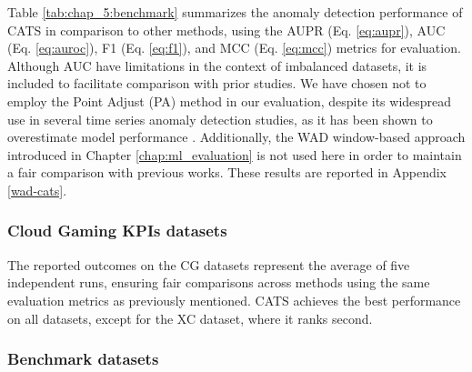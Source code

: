 Table \ref{tab:chap_5:benchmark} summarizes the anomaly detection performance of CATS in comparison to other methods, using the AUPR (Eq. \ref{eq:aupr}), AUC (Eq. \ref{eq:auroc}), F1 (Eq. \ref{eq:f1}), and MCC (Eq. \ref{eq:mcc}) metrics for evaluation. Although AUC have limitations in the context of imbalanced datasets, it is included to facilitate comparison with prior studies. We have chosen not to employ the Point Adjust (PA) method in our evaluation, despite its widespread use in several time series anomaly detection studies, as it has been shown to overestimate model performance \cite{DARBAN2025110874, kim2023contrastive, Ky2023MLMF}. Additionally, the \ac{WAD} window-based approach introduced in Chapter \ref{chap:ml_evaluation} is not used here in order to maintain a fair comparison with previous works. These results are reported in Appendix \ref{wad-cats}.


\subsubsection{Cloud Gaming KPIs datasets}

The reported outcomes on the \ac{CG} datasets represent the average of five independent runs, ensuring fair comparisons across methods using the same evaluation metrics as previously mentioned. CATS achieves the best performance on all datasets, except for the XC dataset, where it ranks second.


\subsubsection{Benchmark datasets}

